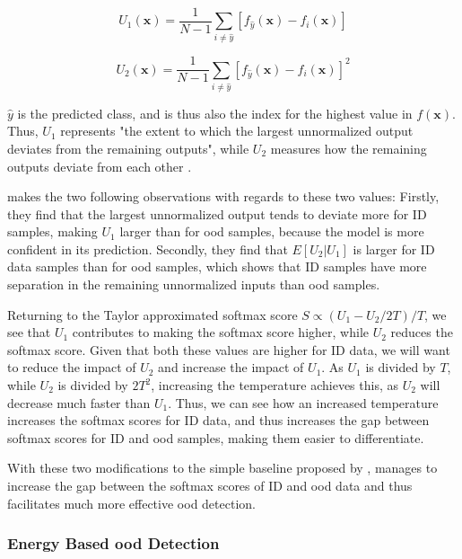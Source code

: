 \documentclass[UKenglish]{uiomasterthesis} %
\theoremstyle{definition}
\begin{document}
\begin{equation}\label{eq::u1u2}
U_{1}(\bm{x})=\frac{1}{N-1}\sum_{i\neq\hat{y}}[f_{\hat{y}}(\bm{x})-f_{i}(\bm{x})]
\end{equation}

\begin{equation}\label{eq::u1u2}
U_{2}(\bm{x})=\frac{1}{N-1}\sum_{i\neq\hat{y}}[f_{\hat{y}}(\bm{x})-f_{i}(\bm{x})]^{2}
\end{equation}

$\hat{y}$ is the predicted class, and is thus also the index for the highest value in $f(\bm{x})$. Thus, $U_1$ represents "the extent to which the largest unnormalized output deviates from the remaining outputs", while $U_2$ measures how the remaining outputs deviate from each other \cite[6]{odin}.

\cite{odin} makes the two following observations with regards to these two values: Firstly, they find that the largest unnormalized output tends to deviate more for ID samples, making $U_1$ larger than for \ac{ood} samples, because the model is more confident in its prediction. Secondly, they find that $E[U_2|U_1]$ is larger for ID data samples than for \ac{ood} samples, which shows that ID samples have more separation in the remaining unnormalized inputs than \ac{ood} samples. 

Returning to the Taylor approximated softmax score ${S\propto {(U_{1}-U_{2}/2T)/T}}$, we see that $U_1$ contributes to making the softmax score higher, while $U_2$ reduces the softmax score. Given that both these values are higher for ID data, we will want to reduce the impact of $U_2$ and increase the impact of $U_1$. As $U_1$ is divided by $T$, while $U_2$ is divided by $2T^2$, increasing the temperature achieves this, as $U_2$ will decrease much faster than $U_1$. Thus, we can see how an increased temperature increases the softmax scores for ID data, and thus increases the gap between softmax scores for ID and \ac{ood} samples, making them easier to differentiate.

With these two modifications to the simple baseline proposed by \cite{oodbaseline}, \cite{odin} manages to increase the gap between the softmax scores of ID and \ac{ood} data and thus facilitates much more effective \ac{ood} detection.
\\

\subsubsection{Energy Based \ac{ood} Detection}
\end{document}
